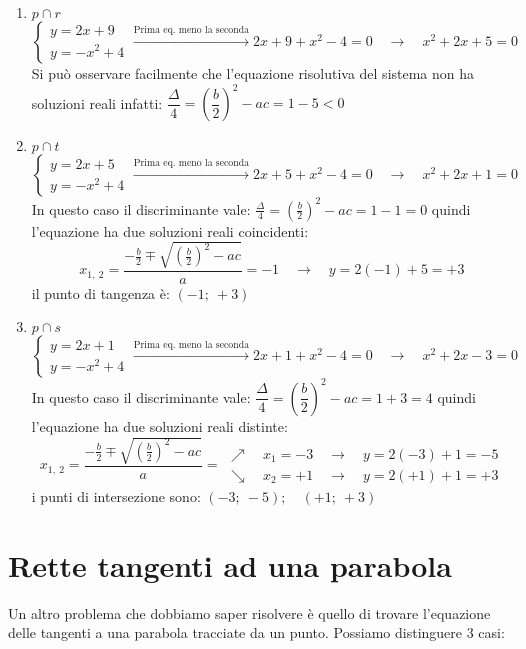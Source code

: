 \begin{enumerate}
 \item \(p \cap r\)
\[\left\{\begin{array}{l}
  y=2x+9\\
  y=-x^2+4
\end{array}\right. \xrightarrow{\text{Prima eq. meno la seconda}}
2x+9+x^2-4=0 \quad \rightarrow \quad x^2+2x+5=0\]
 Si può osservare facilmente che l'equazione risolutiva del sistema non ha 
 soluzioni reali infatti: 
 \(\dfrac{\Delta}{4}=\left(\dfrac{b}{2}\right)^2-ac= 1-5 < 0\)
 \item \(p \cap t\)
\[\left\{\begin{array}{l}
  y=2x+5\\
  y=-x^2+4
\end{array}\right. \xrightarrow{\text{Prima eq. meno la seconda}}
2x+5+x^2-4=0 \quad \rightarrow \quad x^2+2x+1=0\]
 In questo caso il discriminante vale: 
 \(\frac{\Delta}{4}=\left(\frac{b}{2}\right)^2-ac= 1-1 = 0\)
 quindi l'equazione ha due soluzioni reali coincidenti:
 \[x_{1,~2}=\dfrac{-\frac{b}{2} \mp \sqrt{\left(\frac{b}{2}\right)^2-ac}}{a}=
 -1 \quad \rightarrow \quad y=2(-1)+5=+3\]
 il punto di tangenza è: \((-1;~+3)\)
 \item \(p \cap s\)
\[\left\{\begin{array}{l}
  y=2x+1\\
  y=-x^2+4
\end{array}\right. \xrightarrow{\text{Prima eq. meno la seconda}}
2x+1+x^2-4=0 \quad \rightarrow \quad x^2+2x-3=0\]
 In questo caso il discriminante vale: 
 \(\dfrac{\Delta}{4}=\left(\dfrac{b}{2}\right)^2-ac= 1+3 = 4\)
 quindi l'equazione ha due soluzioni reali distinte:
 \[x_{1,~2}=\dfrac{-\frac{b}{2} \mp \sqrt{\left(\frac{b}{2}\right)^2-ac}}{a}=
 \begin{array}{l}
  \nearrow \quad x_1=-3 \quad \rightarrow \quad y=2(-3)+1=-5\\
  \searrow \quad x_2=+1 \quad \rightarrow \quad y=2(+1)+1=+3
 \end{array}\]
 i punti di intersezione sono: \((-3;~-5); \quad (+1;~+3)\)
\end{enumerate}

\section{Rette tangenti ad una parabola}
\label{sec:parabola_altreparabole}

Un altro problema che dobbiamo saper risolvere è quello di trovare 
l'equazione delle tangenti a una parabola tracciate da un punto. 
Possiamo distinguere 3 casi:

